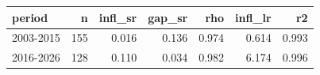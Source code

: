 
\begin{tabular}{lrrrrrr}
\toprule
period & n & infl\_sr & gap\_sr & rho & infl\_lr & r2\\
\midrule
2003-2015 & 155 & 0.016 & 0.136 & 0.974 & 0.614 & 0.993\\
2016-2026 & 128 & 0.110 & 0.034 & 0.982 & 6.174 & 0.996\\
\bottomrule
\end{tabular}
